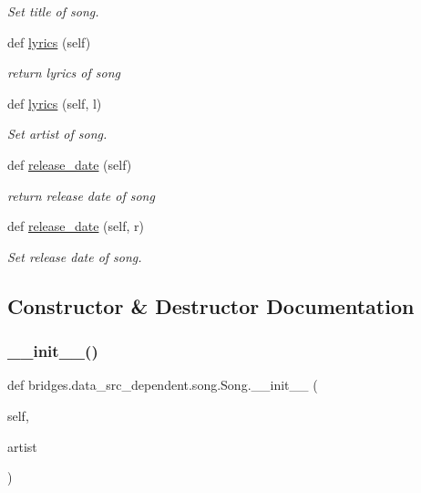 \begin{DoxyCompactItemize}
\begin{DoxyCompactList}\small\item\em Set title of song. \end{DoxyCompactList}\item 
def \hyperlink{classbridges_1_1data__src__dependent_1_1song_1_1_song_a9f7ec8dec6e40fbac228631b23e1734c}{lyrics} (self)
\begin{DoxyCompactList}\small\item\em return lyrics of song \end{DoxyCompactList}\item 
def \hyperlink{classbridges_1_1data__src__dependent_1_1song_1_1_song_ab88a7122f8d962728e25fa0152dd8542}{lyrics} (self, l)
\begin{DoxyCompactList}\small\item\em Set artist of song. \end{DoxyCompactList}\item 
def \hyperlink{classbridges_1_1data__src__dependent_1_1song_1_1_song_af69707705b6d4fbba2884ca3a21343a4}{release\+\_\+date} (self)
\begin{DoxyCompactList}\small\item\em return release date of song \end{DoxyCompactList}\item 
def \hyperlink{classbridges_1_1data__src__dependent_1_1song_1_1_song_a213d73d84e0703204841567dcc2723f3}{release\+\_\+date} (self, r)
\begin{DoxyCompactList}\small\item\em Set release date of song. \end{DoxyCompactList}\end{DoxyCompactItemize}


\subsection{Constructor \& Destructor Documentation}
\mbox{\label{classbridges_1_1data__src__dependent_1_1song_1_1_song_a7f7384595782d5a3a829aa9f96a92845}} 
\subsubsection{\texorpdfstring{\+\_\+\+\_\+init\+\_\+\+\_\+()}{\_\_init\_\_()}}
{\footnotesize\ttfamily def bridges.\+data\+\_\+src\+\_\+dependent.\+song.\+Song.\+\_\+\+\_\+init\+\_\+\+\_\+ (\begin{DoxyParamCaption}\item[{}]{self,  }\item[{}]{artist }\end{DoxyParamCaption})}



